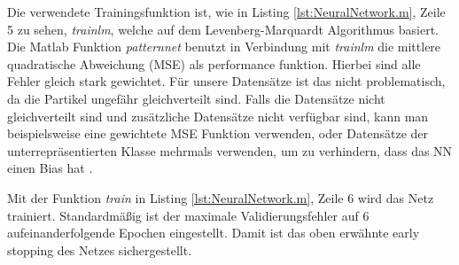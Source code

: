 Die verwendete Trainingsfunktion ist, wie in Listing \ref{lst:NeuralNetwork.m}, Zeile 5 zu sehen, \textit{trainlm}, welche auf dem Levenberg-Marquardt Algorithmus basiert. Die Matlab Funktion \textit{patternnet} benutzt in Verbindung mit \textit{trainlm} die mittlere quadratische Abweichung (MSE) als performance funktion. Hierbei sind alle Fehler gleich stark gewichtet. Für unsere Datensätze ist das nicht problematisch, da die Partikel ungefähr gleichverteilt sind. Falls die Datensätze nicht gleichverteilt sind und zusätzliche Datensätze nicht verfügbar sind, kann man beispielsweise eine gewichtete MSE Funktion verwenden, oder Datensätze der unterrepräsentierten Klasse mehrmals verwenden, um zu verhindern, dass das NN einen Bias hat
\cite{NNDesign}.

Mit der Funktion \textit{train} in Listing \ref{lst:NeuralNetwork.m}, Zeile 6 wird das Netz trainiert. Standardmäßig ist der maximale Validierungsfehler auf 6 aufeinanderfolgende Epochen eingestellt. Damit ist das oben erwähnte early stopping des Netzes sichergestellt.

\begin{minipage}{\textwidth}

\end{minipage}